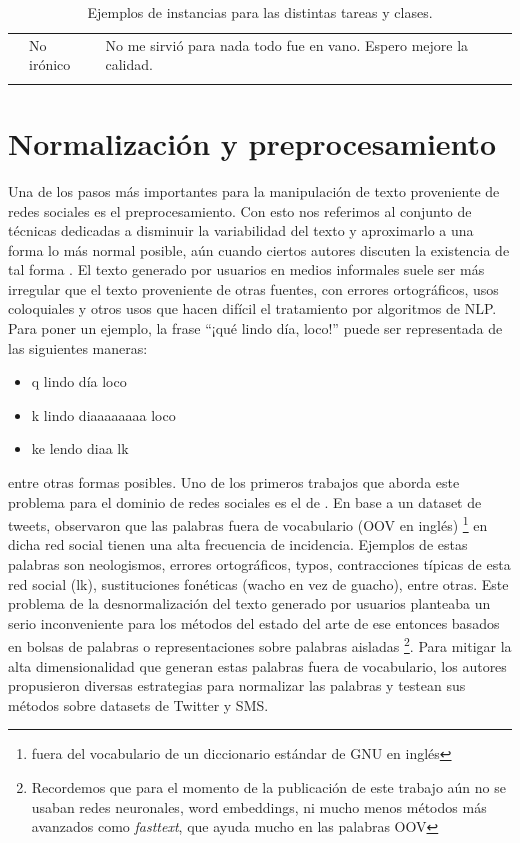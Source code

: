 \begin{table}
\begin{tabularx}{\textwidth}{l l X}
                        \rule{0pt}{2ex}& No irónico     & No me sirvió para nada todo fue en vano. Espero mejore la calidad.	\\
        \Xhline{4\arrayrulewidth}
    \end{tabularx}
    \caption{Ejemplos de instancias para las distintas tareas y clases.}
    \label{tab:03_datasets_examples}
\end{table}



\section{Normalización y preprocesamiento}
\label{sec:03_preprocessing}

Una de los pasos más importantes para la manipulación de texto proveniente de redes sociales es el preprocesamiento. Con esto nos referimos al conjunto de técnicas dedicadas a disminuir la variabilidad del texto y aproximarlo a una forma lo más normal posible, aún cuando ciertos autores discuten la existencia de tal forma \cite{eisenstein2013bad}. El texto generado por usuarios en medios informales suele ser más irregular que el texto proveniente de otras fuentes, con errores ortográficos, usos coloquiales y otros usos que hacen difícil el tratamiento por algoritmos de NLP. Para poner un ejemplo, la frase ``¡qué lindo día, loco!'' puede ser representada de las siguientes maneras:

\begin{itemize}
    \item q lindo día loco
    \item k lindo diaaaaaaaa loco
    \item ke lendo diaa lk
\end{itemize}

\noindent entre otras formas posibles. Uno de los primeros trabajos que aborda este problema para el dominio de redes sociales es el de \citet{han2011lexical}. En base a un dataset de tweets, observaron que las palabras fuera de vocabulario (OOV en inglés) \footnote{fuera del vocabulario de un diccionario estándar de GNU en inglés} en dicha red social tienen una alta frecuencia de incidencia. Ejemplos de estas palabras son neologismos, errores ortográficos, typos, contracciones típicas de esta red social (lk), sustituciones fonéticas (wacho en vez de guacho), entre otras. Este problema de la desnormalización del texto generado por usuarios planteaba un serio inconveniente para los métodos del estado del arte de ese entonces basados en bolsas de palabras o representaciones sobre palabras aisladas \footnote{Recordemos que para el momento de la publicación de este trabajo aún no se usaban redes neuronales, word embeddings, ni mucho menos métodos más avanzados como \emph{fasttext}, que ayuda mucho en las palabras OOV}. Para mitigar la alta dimensionalidad que generan estas palabras fuera de vocabulario, los autores propusieron diversas estrategias para normalizar las palabras y testean sus métodos sobre datasets de Twitter y SMS.

